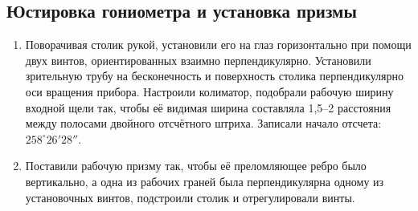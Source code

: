	\subsection{Юстировка гониометра и установка призмы}
	\begin{enumerate}
		\item Поворачивая столик рукой, установили его на глаз горизонтально при помощи двух винтов, ориентированных взаимно перпендикулярно. Установили зрительную трубу на бесконечность и поверхность столика перпендикулярно оси вращения прибора. Настроили колиматор, подобрали рабочую ширину входной щели так, чтобы её видимая ширина составляла 1,5–2 расстояния между полосами двойного отсчётного штриха. Записали начало отсчета: $ 258^\circ26'28'' $. 
		
		\item Поставили рабочую призму так, чтобы её преломляющее ребро было вертикально, а одна из рабочих граней была перпендикулярна одному из установочных винтов, подстроили столик и отрегулировали винты.
	\end{enumerate}
	
